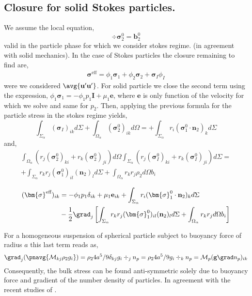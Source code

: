 \subsection{Closure for solid Stokes particles. }
We assume the local equation, 
\begin{equation*}
    \div \bm{\sigma}^0_2 = \textbf{b}_2^0
\end{equation*}
valid in the particle phase for which we consider stokes regime. (in agreement with solid mechanics).
In the case of Stokes particles the closure remaining to find are, 
\begin{align*}
    \bm{\sigma}^\text{eff}
    = \phi_1 \bm{\sigma}_1 + \phi_2 \bm{\sigma}_2  + \bm{\sigma}_I \phi_I 
\end{align*}
were we considered $\avg{\textbf{u}'\textbf{u}'}$. 
For solid particle we close the second term using the expression, $\phi_1 \bm{\sigma}_1 = - \phi_1 p_1 \textbf{I} + \mu_1 \textbf{e}$, where $\textbf{e}$ is only function of the velocity for which we solve and same for $p_2$. 
Then, applying the previous formula for the particle stress in the stokes regime yields, 
\begin{equation}
    \int_{\Sigma_\alpha} 
    (\bm{\sigma}_I)_{ik}
    d\Sigma
    +\int_{\Omega_\alpha} 
    (\bm{\sigma}_2^0)_{ik}
    d\Omega
    = 
    +\int_{\Sigma_\alpha} 
     r_i (\bm{\sigma}_1^0 \cdot \textbf{n}_2)_{k}
    d\Sigma
\end{equation}
and, 
\begin{multline*}
    \int_{\Omega_\alpha} (r_{j}(\bm{\sigma}^0_2)_{ki}+r_{k}(\bm{\sigma}^0_2)_{ji})d\Omega
    \int_{\Sigma_\alpha} (r_{j}(\bm{\sigma}^0_I)_{ki}+r_{k}(\bm{\sigma}_I^0)_{ji})d\Sigma
    = \\
    +\int_{\Sigma_\alpha}  r_{k}r_{j} (\bm{\sigma}_1^0)_{il} (\textbf{n}_2)_l d\Sigma
    + \int_{\Omega_\alpha} r_{k}r_{j}  \rho_2 d\Omega b_i
\end{multline*}

\begin{align*}
    (\bm{\sigma}^\text{eff})_{ik}
    &=- \phi_1 p_1 \delta_{ik} + \mu_1 \textbf{e}_{ik}
    +\int_{\Sigma_\alpha} 
     r_i (\bm{\sigma}_1^0 \cdot \textbf{n}_2)_{k}
    d\Sigma\\
    &- \frac{1}{2}\grad_j \left[
        \int_{\Sigma_\alpha}  r_{k}r_{j} (\bm{\sigma}_1^0)_{il} (\textbf{n}_2)_l d\Sigma
        + \int_{\Omega_\alpha} r_{k}r_{j}   d\Omega b_i
    \right]
\end{align*}


For a homogeneous suspension of spherical particle subject to buoyancy force of radius $a$ this last term reads as,
\begin{equation*}
    \grad_j (\pnavg{\mathcal{M}_{kj}  \rho_2  g_i})
    = \rho_2 4 a^5/9 \delta_{kj} g_i \div_j n_p
    = \rho_2 4 a^5/9 g_i \div_k n_p
    = \mathcal{M}_p  (\textbf{g} \grad n_p)_{ik}
\end{equation*}
Consequently, the bulk stress can be found anti-symmetric solely due to buoyancy force and gradient of the number density of particles. 
In agreement with the recent studies of \citet{wolgemuth2023continuum}.

